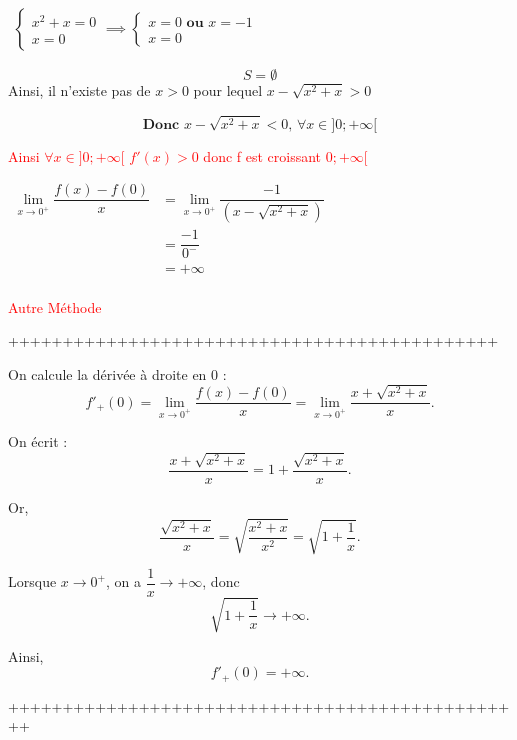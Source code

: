 \documentclass[12pt,a4paper]{article}
\begin{document}
\begin{enumerate}
\begin{enumerate}
\begin{itemize}
\begin{itemize}
$
\begin{aligned}
\begin{cases}
x^2+x = 0\\
x = 0 
\end{cases}\implies
\begin{cases}
x=0 \textbf{ ou } x=-1\\
x = 0
\end{cases}
\end{aligned}
$


$$ S = \emptyset $$ Ainsi, il n'existe pas de $ x > 0 $ pour lequel $ x-\sqrt{x^2+x} > 0  $

 $$ \textbf{Donc } x-\sqrt{x^2+x} <0,  \, \forall x\in ]0;+\infty[ $$

\textcolor{red}{Ainsi  $\forall x\in ]0;+\infty[$ $f'(x) > 0 $ donc f  est croissant $0;+\infty[$}

\(
\begin{aligned}
\lim\limits_{x \to 0^+} \dfrac{f(x)-f(0)}{x} &=\lim\limits_{x \to 0^+} \dfrac{-1}{(x - \sqrt{x^2+x})}\\
															               &=\dfrac{-1}{0^-}\\
															               &=+\infty \\
\end{aligned}    
\)

\textcolor{red}{ Autre Méthode }

+++++++++++++++++++++++++++++++++++++++++++++

On calcule la dérivée à droite en $0$ :
\[
f'_+(0)=\lim_{x\to 0^+}\frac{f(x)-f(0)}{x}
=\lim_{x\to 0^+}\frac{x+\sqrt{x^2+x}}{x}.
\]

On écrit :
\[
\frac{x+\sqrt{x^2+x}}{x}
=1+\frac{\sqrt{x^2+x}}{x}.
\]

Or,
\[
\frac{\sqrt{x^2+x}}{x}
=\sqrt{\frac{x^2+x}{x^2}}
=\sqrt{1+\frac{1}{x}}.
\]

Lorsque $x\to 0^+$, on a $\dfrac{1}{x}\to +\infty$, donc
\[
\sqrt{1+\frac{1}{x}}\to +\infty.
\]

Ainsi,
\[
f'_+(0)=+\infty.
\]

++++++++++++++++++++++++++++++++++++++++++++++++


\end{itemize}
\end{itemize}
\end{enumerate}
\end{enumerate}
\end{document}
